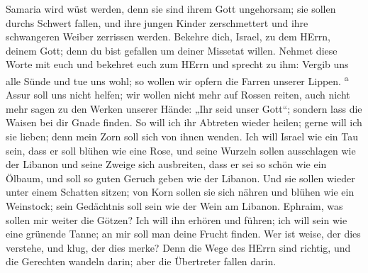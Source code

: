  Samaria wird wüst werden, denn sie sind ihrem Gott
ungehorsam; sie sollen durchs Schwert fallen, und ihre jungen Kinder
zerschmettert und ihre schwangeren Weiber zerrissen werden.
 Bekehre dich, Israel, zu dem HErrn, deinem Gott; denn du
bist gefallen um deiner Missetat willen.  Nehmet diese
Worte mit euch und bekehret euch zum HErrn und sprecht zu ihm: Vergib
uns alle Sünde und tue uns wohl; so wollen wir opfern die Farren unserer
Lippen. \textsuperscript{a}  Assur soll uns nicht helfen;
wir wollen nicht mehr auf Rossen reiten, auch nicht mehr sagen zu den
Werken unserer Hände: „Ihr seid unser Gott``; sondern lass die Waisen
bei dir Gnade finden.  So will ich ihr Abtreten wieder
heilen; gerne will ich sie lieben; denn mein Zorn soll sich von ihnen
wenden.  Ich will Israel wie ein Tau sein, dass er soll
blühen wie eine Rose, und seine Wurzeln sollen ausschlagen wie der
Libanon  und seine Zweige sich ausbreiten, dass er sei so
schön wie ein Ölbaum, und soll so guten Geruch geben wie der Libanon.
 Und sie sollen wieder unter einem Schatten sitzen; von
Korn sollen sie sich nähren und blühen wie ein Weinstock; sein
Gedächtnis soll sein wie der Wein am Libanon.  Ephraim,
was sollen mir weiter die Götzen? Ich will ihn erhören und führen; ich
will sein wie eine grünende Tanne; an mir soll man deine Frucht finden.
 Wer ist weise, der dies verstehe, und klug, der dies
merke? Denn die Wege des HErrn sind richtig, und die Gerechten wandeln
darin; aber die Übertreter fallen darin.
